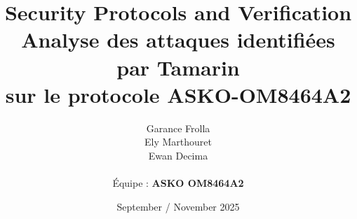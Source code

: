 \documentclass[11pt]{article}
\begin{document}
    \title{
            { \textbf{Security Protocols and Verification}} \\[1ex]
        {\small Analyse des attaques identifiées par Tamarin\\sur le protocole ASKO-OM8464A2}
    }


    \author{
        Garance Frolla \\
        Ely Marthouret \\
        Ewan Decima\\ \\
        Équipe : \textbf{ASKO OM8464A2}
    }

    \date{September / November 2025}


    \maketitle
    \tableofcontents
    \newpage


    
    
    
    
    
\end{document}
